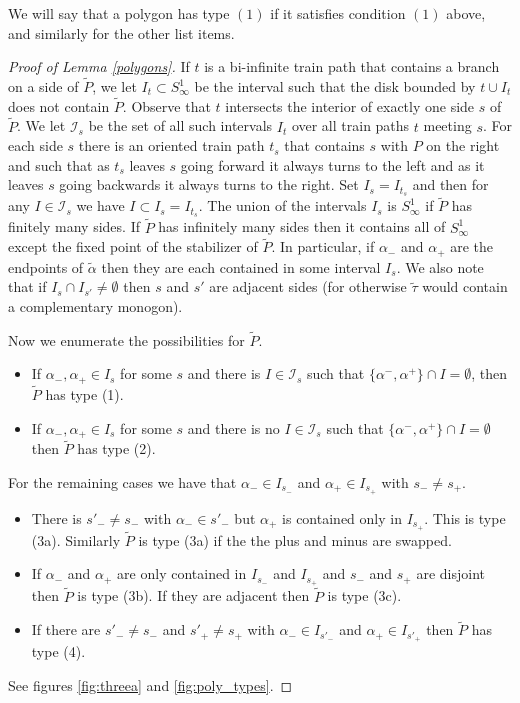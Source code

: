 \documentclass[11pt]{article}
\theoremstyle{remark}
\newcommand{\cI}{{\mathcal I}}
\begin{document}
We will say that a polygon has type $(1)$ if it satisfies condition $(1)$ above, and
similarly for the other list items.

\begin{proof}[Proof of Lemma \ref{polygons}]
If $t$ is a bi-infinite train path that contains a branch on a side of $\tilde P$, we let $I_t \subset S^1_\infty$ be the interval such that the disk bounded by $t \cup I_t$ does not contain $\tilde P$. Observe that $t$ intersects the interior of exactly one side $s$ of $\tilde P$.
 We let $\cI_s$ be the set of all such intervals $I_t$ over all train paths $t$ meeting $s$.
 For each side $s$ there is an oriented train path $t_s$ that contains $s$ with $P$ on the right and such that as $t_s$ leaves $s$ going forward it always turns to the left and as it leaves $s$ going backwards it always turns to the right.  Set $I_s = I_{t_s}$ and then for any $I \in \cI_s$ we have $I \subset I_s = I_{t_s}$.
 The union of the intervals $I_s$ is $S^1_\infty$ if $\tilde P$ has finitely many sides.
 If $\tilde P$ has infinitely many sides then it contains all of $S^1_\infty$ except the fixed point of the stabilizer of $\tilde P$.
 In particular, if $\alpha_-$ and $\alpha_+$ are the endpoints of $\tilde \alpha$ then they are each contained in some interval $I_s$. We also note that if $I_s \cap I_{s'} \neq \emptyset$ then $s$ and $s'$ are adjacent sides (for otherwise $\tilde \tau$ would contain a complementary monogon).
 
 Now we enumerate the possibilities for $\tilde P$.

\begin{itemize}
\item If $\alpha_-, \alpha_+ \in I_s$ for some $s$ and there is $I \in \cI_s$ such that $\{\alpha^-,\alpha^+\} \cap I = \emptyset$, then $\tilde P$ has type (1).

\item If $\alpha_-, \alpha_+ \in I_s$ for some $s$ and there is no $I \in \cI_s$ such that $\{\alpha^-,\alpha^+\} \cap I = \emptyset$ then $\tilde P$ has type (2).

\end{itemize}
For the remaining cases we have that $\alpha_- \in I_{s_-}$ and $\alpha_+ \in I_{s_+}$ with $s_- \neq s_+$.
\begin{itemize}
\item There is $s'_- \neq s_-$ with $\alpha_- \in s'_-$ but $\alpha_+$ is contained only in $I_{s_+}$. This is type (3a). Similarly $\tilde P$ is type (3a) if the the plus and minus are swapped.

\item If $\alpha_-$ and $\alpha_+$ are only contained in $I_{s_-}$ and $I_{s_+}$ and $s_-$ and $s_+$ are disjoint then $\tilde P$ is type (3b). If they are adjacent then $\tilde P$ is type (3c).

\item If there are $s'_-\neq s_-$ and $s'_+ \neq s_+$ with $\alpha_- \in I_{s'_-}$ and $\alpha_+ \in I_{s'_+}$ then $\tilde P$ has type (4).
\end{itemize} 
See figures \ref{fig:threea} and \ref{fig:poly_types}. \end{proof}
\end{document}
